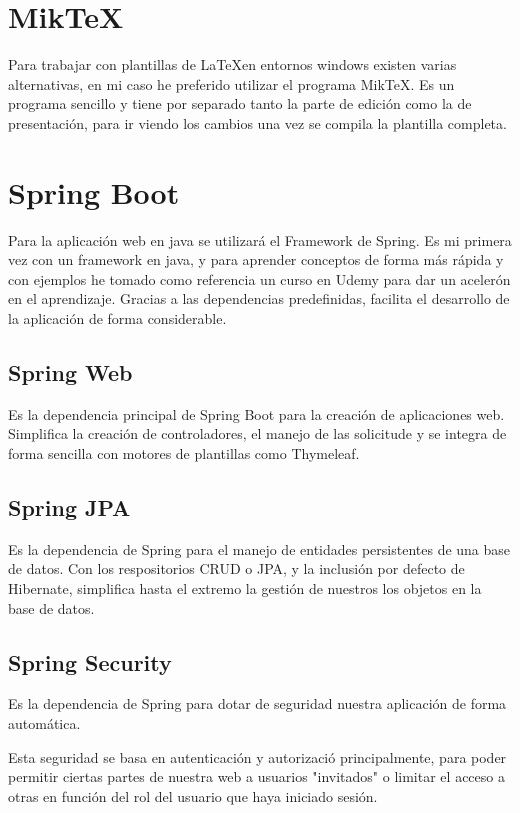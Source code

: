 \section{Mik\TeX{}}
Para trabajar con plantillas de \LaTeX  en entornos windows existen varias alternativas, en mi caso he preferido utilizar el programa Mik\TeX{}.
Es un programa sencillo y tiene por separado tanto la parte de edición como la de presentación, para ir viendo los cambios una vez se compila la plantilla completa.

\section{Spring Boot}

Para la aplicación web en java se utilizará el Framework de Spring.
Es mi primera vez con un framework en java, y para aprender conceptos de forma más rápida y con ejemplos he tomado como referencia un curso en Udemy \cite{udemy:eliseo} para dar un acelerón en el aprendizaje.
Gracias a las dependencias predefinidas, facilita el desarrollo de la aplicación de forma considerable.

\subsection{Spring Web}

Es la dependencia principal de Spring Boot para la creación de aplicaciones web. 
Simplifica la creación de controladores, el manejo de las solicitude y se integra de forma sencilla con motores de plantillas como Thymeleaf.

\subsection{Spring JPA}

Es la dependencia de Spring para el manejo de entidades persistentes de una base de datos. 
Con los respositorios CRUD o JPA, y la inclusión por defecto de Hibernate, simplifica hasta el extremo la gestión de nuestros los objetos en la base de datos.

\subsection{Spring Security}

Es la dependencia de Spring para dotar de seguridad nuestra aplicación de forma automática.

Esta seguridad se basa en autenticación y autorizació principalmente, para poder permitir ciertas partes de nuestra web a usuarios "invitados" o limitar el acceso a otras en función del rol del usuario que haya iniciado sesión.

